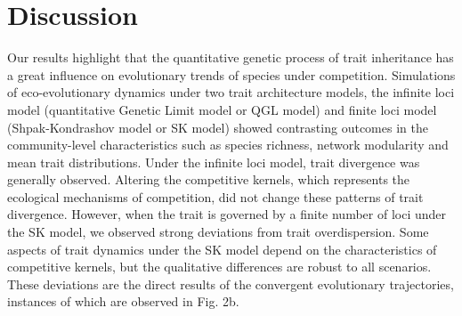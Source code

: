 \documentclass[12pt]{article}
\begin{document}
\section{Discussion}

Our results highlight that the quantitative genetic process of trait inheritance has a great influence on evolutionary trends of species under competition. Simulations of eco-evolutionary dynamics under two trait architecture models, the infinite loci model (quantitative Genetic Limit model or QGL model) and finite loci model (Shpak-Kondrashov model or SK model) showed contrasting outcomes in the community-level characteristics such as species richness, network modularity and mean trait distributions. Under the infinite loci model, trait divergence was generally observed. Altering the competitive kernels, which represents the ecological mechanisms of competition, did not change these patterns of trait divergence. However, when the trait is governed by a finite number of loci under the SK model, we observed strong deviations from trait overdispersion. Some aspects of trait dynamics under the SK model depend on the characteristics of competitive kernels, but the qualitative differences are robust to all scenarios. These deviations are the direct results of the convergent evolutionary trajectories, instances of which are observed in Fig. 2b. \par
\end{document}
